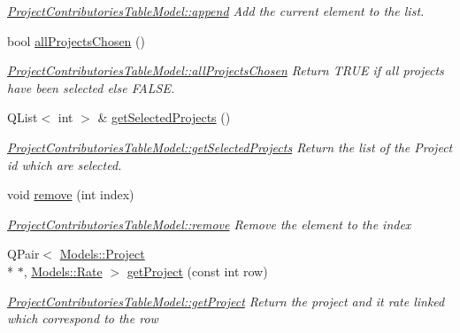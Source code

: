 \begin{DoxyCompactItemize}
\begin{DoxyCompactList}\small\item\em \hyperlink{classGui_1_1Widgets_1_1WdgModels_1_1ProjectContributoriesTableModel_a7bb1cd1299d72ce4d6a35cc38bff5a70}{Project\-Contributories\-Table\-Model\-::append} Add the current element to the list. \end{DoxyCompactList}\item 
bool \hyperlink{classGui_1_1Widgets_1_1WdgModels_1_1ProjectContributoriesTableModel_a2c7223dafc05fff7c0194820fd1e8ef8}{all\-Projects\-Chosen} ()
\begin{DoxyCompactList}\small\item\em \hyperlink{classGui_1_1Widgets_1_1WdgModels_1_1ProjectContributoriesTableModel_a2c7223dafc05fff7c0194820fd1e8ef8}{Project\-Contributories\-Table\-Model\-::all\-Projects\-Chosen} Return T\-R\-U\-E if all projects have been selected else F\-A\-L\-S\-E. \end{DoxyCompactList}\item 
Q\-List$<$ int $>$ \& \hyperlink{classGui_1_1Widgets_1_1WdgModels_1_1ProjectContributoriesTableModel_ab32f6d5b6e708b08cce0a83411f1eedc}{get\-Selected\-Projects} ()
\begin{DoxyCompactList}\small\item\em \hyperlink{classGui_1_1Widgets_1_1WdgModels_1_1ProjectContributoriesTableModel_ab32f6d5b6e708b08cce0a83411f1eedc}{Project\-Contributories\-Table\-Model\-::get\-Selected\-Projects} Return the list of the Project id which are selected. \end{DoxyCompactList}\item 
void \hyperlink{classGui_1_1Widgets_1_1WdgModels_1_1ProjectContributoriesTableModel_ae142b64f61cf2337cf3fcb3d6ce291ec}{remove} (int index)
\begin{DoxyCompactList}\small\item\em \hyperlink{classGui_1_1Widgets_1_1WdgModels_1_1ProjectContributoriesTableModel_ae142b64f61cf2337cf3fcb3d6ce291ec}{Project\-Contributories\-Table\-Model\-::remove} Remove the element to the {\itshape index} \end{DoxyCompactList}\item 
Q\-Pair$<$ \hyperlink{classModels_1_1Project}{Models\-::\-Project} \\*
$\ast$, \hyperlink{classModels_1_1Rate}{Models\-::\-Rate} $>$ \hyperlink{classGui_1_1Widgets_1_1WdgModels_1_1ProjectContributoriesTableModel_af44a062f618d9c8b095bdb5170c1403b}{get\-Project} (const int row)
\begin{DoxyCompactList}\small\item\em \hyperlink{classGui_1_1Widgets_1_1WdgModels_1_1ProjectContributoriesTableModel_af44a062f618d9c8b095bdb5170c1403b}{Project\-Contributories\-Table\-Model\-::get\-Project} Return the project and it rate linked which correspond to the {\itshape row} \end{DoxyCompactList}\item 

\end{DoxyCompactItemize}
